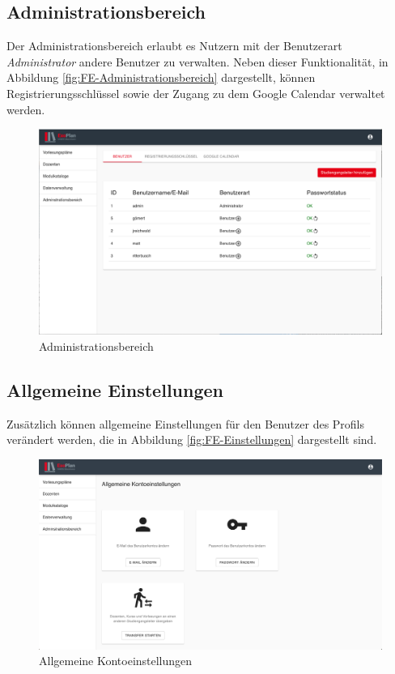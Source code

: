 \subsection{Administrationsbereich}
Der Administrationsbereich erlaubt es Nutzern mit der Benutzerart \textit{Administrator} andere Benutzer zu verwalten.
Neben dieser Funktionalität, in Abbildung \vref{fig:FE-Administrationsbereich} dargestellt, können Registrierungsschlüssel sowie der Zugang zu dem Google Calendar verwaltet werden.
\begin{figure}[H]
	\centering 
	\includegraphics[width=\textwidth]{img/FrontEnd/Administrationsbereich.png}
	\caption[Administrationsbereich]{\label{fig:FE-Administrationsbereich}Administrationsbereich}
\end{figure}

\subsection{Allgemeine Einstellungen}
Zusätzlich können allgemeine Einstellungen für den Benutzer des Profils verändert werden, die in Abbildung \vref{fig:FE-Einstellungen} dargestellt sind.
\begin{figure}[H]
	\centering 
	\includegraphics[width=\textwidth]{img/FrontEnd/Einstellungen.png}
	\caption[Allgemeine Kontoeinstellungen]{\label{fig:FE-Einstellungen}Allgemeine Kontoeinstellungen}
\end{figure}
